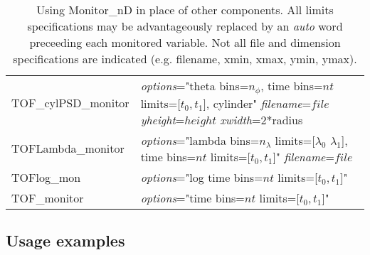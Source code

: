 \begin{table}
\begin{center}
{\begin{tabular}{|p{}|p{}|}
TOF\_cylPSD\_monitor & \textit{options}="theta bins=$n_\phi$, time bins=$nt$ limits=[$t_0, t_1$], cylinder" \textit{filename}=$file$ \textit{yheight}=$height$ \textit{xwidth}=2*radius\\
TOFLambda\_monitor  & \textit{options}="lambda bins=$n_\lambda$ limits=[$\lambda_0$ $\lambda_1$], time bins=$nt$ limits=[$t_0, t_1$]" \textit{filename}=$file$\\
TOFlog\_mon         & \textit{options}="log time bins=$nt$ limits=[$t_0, t_1$]" \\
TOF\_monitor        & \textit{options}="time bins=$nt$ limits=[$t_0, t_1$]" \\
\hline
    \end{tabular}
    \caption{Using Monitor\_nD in place of other components. All limits specifications may be advantageously replaced by an \textit{auto} word preceeding each monitored variable. Not all file and dimension specifications are indicated (e.g. filename, xmin, xmax, ymin, ymax).}
    \label{t:monitor-nd-equiv}
    }
  \end{center}
\end{table}

\subsection{Usage examples}

